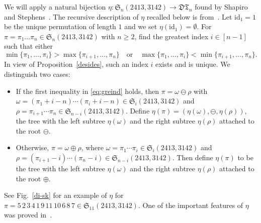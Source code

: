 \documentclass[12pt]{amsart}
\numberwithin{equation}{section}
\def\blue{\textcolor{blue}}
\def\red{\textcolor{red}}
\theoremstyle{plain}
\theoremstyle{definition}
\def\S{\mathfrak{S}}
\newcommand{\id}{\mathrm{id}}
\def\id{\mathrm{id}}
\newcommand{\DT}{\mathfrak{DT}}
\begin{document}
We will apply a natural  bijection $\eta:\S_n(2413,3142)\rightarrow \DT_n$ found by Shapiro and Stephens~\cite{shapi}. The recursive description of $\eta$ recalled below is from~\cite{flz}. Let $\id_1=1$ be the unique permutation of length $1$ and we set $\eta(\id_1)=\emptyset$. For $\pi=\pi_1\ldots\pi_n\in\S_n(2413,3142)$ with $n\geq2$,  find the greatest index $i\in[n-1]$ such that either 
 \begin{equation}\label{eq:greind}
 \min\{\pi_1,\ldots,\pi_i\}>\max\{\pi_{i+1},\ldots,\pi_n\}\quad\text{or}\quad\max\{\pi_1,\ldots,\pi_i\}<\min\{\pi_{i+1},\ldots,\pi_n\}.
 \end{equation}
 In view of Proposition~\ref{desides}, such an index $i$ exists and is unique. We distinguish two cases:
 \begin{itemize}
 \item If the first inequality in \eqref{eq:greind} holds, then $\pi=\omega\ominus\rho$ with $\omega=(\pi_1+i-n)\cdots(\pi_i+i-n)\in\S_i(2413,3142)$ and $\rho=\pi_{i+1}\cdots\pi_{n}\in\S_{n-i}(2413,3142)$. Define $\eta(\pi)=(\eta(\omega),\ominus,\eta(\rho))$, the tree with the left subtree $\eta(\omega)$ and the right subtree $\eta(\rho)$ attached to the root $\ominus$. 
 \item Otherwise,  $\pi=\omega\oplus\rho$, where $\omega=\pi_1\cdots\pi_i\in\S_i(2413,3142)$ and $\rho=(\pi_{i+1}-i)\cdots(\pi_{n}-i)\in\S_{n-i}(2413,3142)$. Then define $\eta(\pi)$ to be the tree with the left subtree $\eta(\omega)$ and the right subtree $\eta(\rho)$ attached to the root $\oplus$.
\end{itemize}
See Fig.~\ref{di-sk} for an example of $\eta$ for $\pi=5\,2\,3\,4\,1\,9\,11\,10\,6\,8\,7\in\S_{11}(2413,3142)$. One of the important features of $\eta$ was proved in~\cite{flz}.



%
%
%
%
\end{document}

